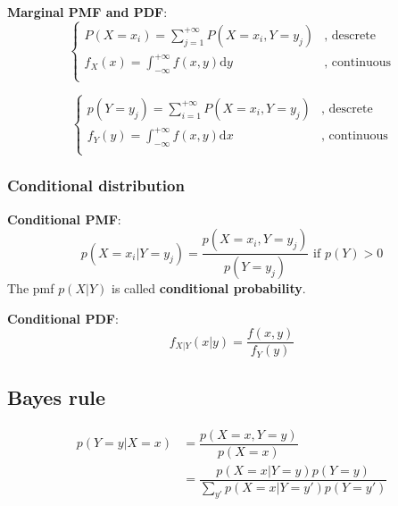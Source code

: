 \textbf{Marginal PMF and PDF}:
\begin{equation} \begin{cases}
P(X=x_i)=\sum_{j=1}^{+\infty}P(X=x_i,Y=y_j) & \text{, descrete}\\
f_X(x)=\int_{-\infty}^{+\infty} f(x,y)\mathrm{d}y & \text{, continuous}\\
\end{cases}\end{equation}

\begin{equation}\begin{cases}
p(Y=y_j)=\sum_{i=1}^{+\infty}P(X=x_i,Y=y_j) & \text{, descrete}\\
f_Y(y)=\int_{-\infty}^{+\infty} f(x,y)\mathrm{d}x & \text{, continuous}\\
\end{cases}\end{equation}


\subsubsection{Conditional distribution}
\textbf{Conditional PMF}:
\begin{equation}
p(X=x_i|Y=y_j)=\dfrac{p(X=x_i,Y=y_j)}{p(Y=y_j)} \text{ if } p(Y)>0
\end{equation}
The pmf $p(X|Y)$ is called \textbf{conditional probability}.

\textbf{Conditional PDF}:
\begin{equation}
f_{X|Y}(x|y)=\dfrac{f(x,y)}{f_Y(y)}
\end{equation}

\subsection{Bayes rule}
\begin{equation}
\begin{split}
p(Y=y|X=x) & =\dfrac{p(X=x,Y=y)}{p(X=x)} \\
           & =\dfrac{p(X=x|Y=y)p(Y=y)}{\sum_{y'}p(X=x|Y=y')p(Y=y')}
\end{split}
\end{equation}


